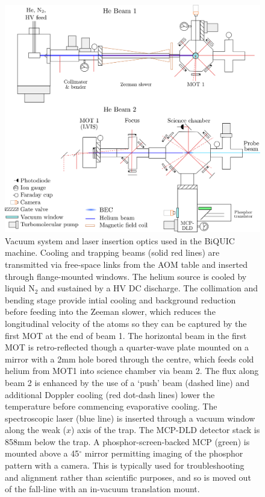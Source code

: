 		\begin{figure}
		\centering
		\includegraphics[width=\textwidth]{fig/apparatus/vacuum_schematic_simplified}
		\caption{Vacuum system and laser insertion optics used in the BiQUIC machine. Cooling and trapping beams (solid red lines) are transmitted via free-space links from the AOM table and inserted through flange-mounted windows. The helium source is cooled by liquid $\textrm{N}_2$ and sustained by a HV DC discharge. The collimation and bending stage provide intial cooling and background reduction before feeding into the Zeeman slower, which reduces the longitudinal velocity of the atoms so they can be captured by the first MOT at the end of beam 1. The horizontal beam in the first MOT is retro-reflected though a quarter-wave plate mounted on a mirror with a 2mm hole bored through the centre, which feeds cold helium from MOT1 into science chamber via beam 2. The flux along beam 2 is enhanced by the use of a `push' beam (dashed line) and additional Doppler cooling (red dot-dash lines) lower the temperature before commencing evaporative cooling. The spectroscopic laser (blue line) is inserted through a vacuum window along the weak ($x$) axis of the trap. The MCP-DLD detector stack is 858mm below the trap. A phosphor-screen-backed MCP (green) is mounted above a 45$^\circ$ mirror permitting imaging of the phosphor pattern with a camera. This is typically used for troubleshooting and alignment rather than scientific purposes, and so is moved out of the fall-line with an in-vacuum translation mount.}
		\label{fig:apparatus}
	\end{figure}
	
